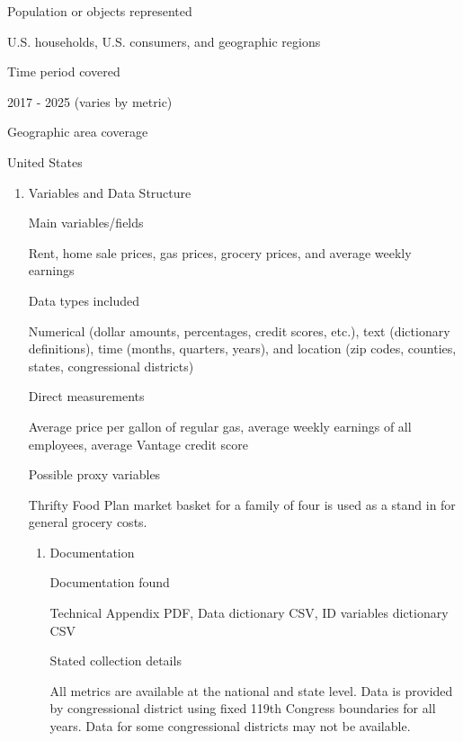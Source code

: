 \documentclass[
  letterpaper,
  DIV=11,
  numbers=noendperiod]{scrartcl}
\providecommand{\tightlist}{%
  \setlength{\itemsep}{0pt}\setlength{\parskip}{0pt}}
\begin{document}
\begin{enumerate}
\begin{enumerate}
\begin{enumerate}
      Population or objects represented

      U.S. households, U.S. consumers, and geographic regions

      Time period covered

      2017 - 2025 (varies by metric)

      Geographic area coverage

      United States

      \begin{enumerate}
      \def\labelenumiv{\arabic{enumiv}.}
      \setcounter{enumiv}{3}
      \tightlist
      \item
        Variables and Data Structure

        Main variables/fields

        Rent, home sale prices, gas prices, grocery prices, and average
        weekly earnings

        Data types included

        Numerical (dollar amounts, percentages, credit scores, etc.),
        text (dictionary definitions), time (months, quarters, years),
        and location (zip codes, counties, states, congressional
        districts)

        Direct measurements

        Average price per gallon of regular gas, average weekly earnings
        of all employees, average Vantage credit score

        Possible proxy variables

        Thrifty Food Plan market basket for a family of four is used as
        a stand in for general grocery costs.

        \begin{enumerate}
        \def\labelenumv{\arabic{enumv}.}
        \tightlist
        \item
          Documentation

          Documentation found

          Technical Appendix PDF, Data dictionary CSV, ID variables
          dictionary CSV

          Stated collection details

          All metrics are available at the national and state level.
          Data is provided by congressional district using fixed 119th
          Congress boundaries for all years. Data for some congressional
          districts may not be available.
        \end{enumerate}
      \end{enumerate}
    \end{enumerate}
  \end{enumerate}
\end{enumerate}
\end{document}
